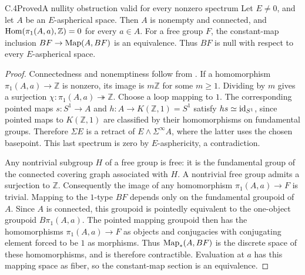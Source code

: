 \begin{claim}{C.4}{Proved}{A nullity obstruction valid for every nonzero spectrum}
Let $E\neq0$, and let $A$ be an $E$-aspherical space. Then $A$ is
nonempty and connected, and
$\operatorname{Hom}(\pi_1(A,a),\mathbb Z)=0$ for every $a\in A$. For a free group
$F$, the constant-map inclusion
$BF\to\operatorname{Map}(A,BF)$ is an equivalence. Thus $BF$ is null with respect
to every $E$-aspherical space.
\end{claim}
\begin{proof}
Connectedness and nonemptiness follow from . If a
homomorphism $\pi_1(A,a)\to\mathbb Z$ is nonzero, its image is
$m\mathbb Z$ for some $m\geq1$. Dividing by $m$ gives a surjection
$\chi:\pi_1(A,a)\twoheadrightarrow\mathbb Z$. Choose a loop mapping
to $1$. The corresponding pointed maps
$s:S^1\to A$ and $h:A\to K(\mathbb Z,1)=S^1$ satisfy
$hs\simeq\mathrm{id}_{S^1}$, since pointed maps to $K(\mathbb Z,1)$ are
classified by their homomorphisms on fundamental groups. Therefore
$\Sigma E$ is a retract of $E\wedge\Sigma^\infty A$, where the latter
uses the chosen basepoint. This last spectrum is zero by
$E$-asphericity, a contradiction.

Any nontrivial subgroup $H$ of a free group is free: it is the
fundamental group of the connected covering graph associated with
$H$. A nontrivial free group admits a surjection to $\mathbb Z$.
Consequently the image of any homomorphism $\pi_1(A,a)\to F$ is
trivial. Mapping to the $1$-type $BF$ depends only on the fundamental
groupoid of $A$. Since $A$ is connected, this groupoid is
pointedly equivalent to the one-object groupoid
$B\pi_1(A,a)$. The pointed mapping groupoid then has the
homomorphisms $\pi_1(A,a)\to F$ as objects and conjugacies
with conjugating element forced to be $1$ as morphisms.
Thus $\operatorname{Map}_*(A,BF)$ is the discrete space of these
homomorphisms, and is therefore contractible.
Evaluation at $a$ has this mapping space as
fiber, so the constant-map section is an equivalence.
\end{proof}

